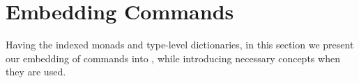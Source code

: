 \newcommand{\framedhslinecorrect}[2]%
  {#1[#2]}

\newcommand{\framedhs}{\sethscode{framedhscode}}


\newenvironment{inlinehscode}%
  {\(\def\column##1##2{}%
   \let\>\undefined\let\<\undefined\let\\\undefined
   \newcommand\>[1][]{}\newcommand\<[1][]{}\newcommand\\[1][]{}%
   \def\fromto##1##2##3{##3}%
   \def\nextline{}}{\) }%

\newcommand{\inlinehs}{\sethscode{inlinehscode}}


\newenvironment{joincode}%
  {\let\orighscode=\hscode
   \let\origendhscode=\endhscode
   \def\endhscode{\def\hscode{\endgroup\def\@currenvir{hscode}\\}\begingroup}
   \orighscode\def\hscode{\endgroup\def\@currenvir{hscode}}}%
  {\origendhscode
   \global\let\hscode=\orighscode
   \global\let\endhscode=\origendhscode}%

\makeatother
\EndFmtInput
%

%
\makeatletter

\let\Varid\mathit
\let\Conid\mathsf

\def\commentbegin{\quad\{\ }
\def\commentend{\}}

\newcommand{\ty}[1]{\Conid{#1}}
\newcommand{\con}[1]{\Conid{#1}}
\newcommand{\id}[1]{\Varid{#1}}
\newcommand{\cl}[1]{\Varid{#1}}
\newcommand{\opsym}[1]{\mathrel{#1}}

\newcommand\Keyword[1]{\textbf{\textsf{#1}}}
\newcommand\Hide{\mathbin{\downarrow}}
\newcommand\Reveal{\mathbin{\uparrow}}




\makeatother
\EndFmtInput

\section{Embedding \Hedis{} Commands}
\label{sec:embedding-commands}

Having the indexed monads and type-level dictionaries, in this section we
present our embedding of \Hedis{} commands into \Edis{}, while introducing
necessary concepts when they are used.

